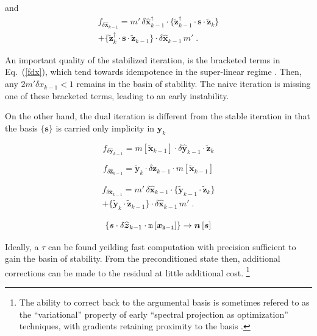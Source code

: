 \documentclass[letterpaper,twocolumn,amsmath,amsfont,amssymb,english,aps,jcp,preprintnumbers,groupaddress,nofootinbib,tightenlines]{revtex4}
\newcommand{\mat}[1]{\boldsymbol{#1}}
\newcommand{\mmat}[1]{\widetilde{\boldsymbol{#1}}}
\begin{document}
and 
\begin{multline} \label{fdx}
f_{\delta \widehat{\mat{x}}_{k-1}} 
= m' \, \delta \widehat{\mat{x}}^\dagger_{k-1} \cdot   
\{\widetilde{\mat{z}}^\dagger_{k-1}  \cdot \mat{s} \cdot \widetilde{\mat{z}}_{k} \}  \\
+ \{ \widetilde{\mat{z}}^\dagger_{k} \cdot \mat{s} \cdot  \widetilde{\mat{z}}_{k-1} \} 
\cdot \delta \widehat{\mat{x}}_{k-1} \, m' \;.
\end{multline}

An important quality of the stabilized iteration, is the bracketed terms in Eq.~(\ref{fdx}), which
tend towards idempotence in the super-linear regime \cite{}.  Then, any $2 m' \delta x_{k-1} < 1 $ remains in the
basin of stability.  The naive iteration is missing one of these bracketed terms, leading to an early instability. 

On the other hand, the dual iteration is different from the stable iteration in that the basis $\{\mat{s}\}$
is carried only implicity in $\mat{y}_k$

\begin{equation} 
f_{\delta \widehat{\mat{y}}_{k-1}} 
= m\left[\mmat{x}_{k-1} \right]  \cdot  \delta \widehat{\mat{y}}_{k-1} \cdot  \widetilde{\mat{z}}_{k}  
\end{equation}


\begin{equation} 
f_{\delta \widehat{\mat{z}}_{k-1}} =  \mmat{y}_{k} \cdot  \delta \mat{z}_{k-1}  \cdot m\left[\mmat{x}_{k-1} \right]  
\end{equation}


\begin{multline} \label{fyzdx}
f_{\delta \widehat{\mat{x}}_{k-1}} 
= m'  \, \delta \widehat{\mat{x}}_{k-1} \cdot    
\{\widetilde{\mat{y}}_{k-1}  \cdot \widetilde{\mat{z}}_{k} \}  \\
+ \{ \widetilde{\mat{y}}_{k} \cdot \widetilde{\mat{z}}_{k-1} \} 
\cdot  \delta \widehat{\mat{x}}_{k-1} \,  m'  \;.
\end{multline}


\begin{equation}
\{ \mat{s} \cdot \delta {\widehat{\mat{z}}}_{k-1}
\cdot \tt{m}\left[\mat{x}_{k-1} \right]    \} 
\rightarrow \mat{n}\left[\mat{s} \right]
\end{equation}

Ideally, a $\tau$ can be found yeilding fast computation with precision sufficient to gain the basin of stability.  From the
preconditioned state then, additional corrections can be made to the residual at little additional 
cost. \footnote{The ability to correct back to the argumental basis is sometimes refered to as 
the ``variational'' property of early ``spectral projection as optimization'' techniques, with 
gradients retaining proximity to the basis \cite{}.}
\end{document}
